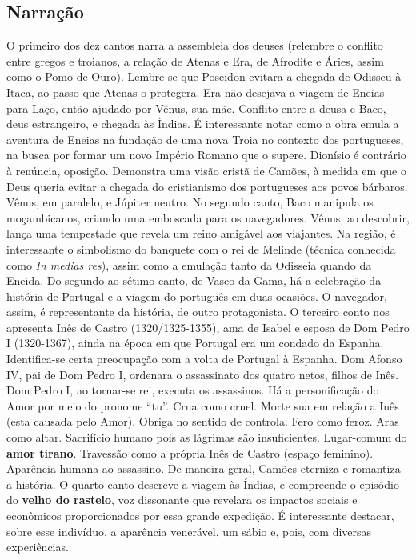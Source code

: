 \documentclass[12pt]{book}
\begin{document}
 				\subsection{Narração}
				\par O primeiro dos dez cantos narra a assembleia dos deuses (relembre o conflito entre gregos e troianos, a relação de Atenas e Era, de Afrodite e Áries, assim como o Pomo de Ouro). Lembre-se que Poseidon evitara a chegada de Odisseu à Itaca, ao passo que Atenas o protegera. Era não desejava a viagem de Eneias para Laço, então ajudado por Vênus, sua mãe. Conflito entre a deusa e Baco, deus estrangeiro, e chegada às Índias. É interessante notar como a obra emula a aventura de Eneias na fundação de uma nova Troia no contexto dos portugueses, na busca por formar um novo Império Romano que o supere. Dionísio é contrário à renúncia, oposição. Demonstra uma visão cristã de Camões, à medida em que o Deus queria evitar a chegada do cristianismo dos portugueses aos povos bárbaros. Vênus, em paralelo, e Júpiter neutro. No segundo canto, Baco manipula os moçambicanos, criando uma emboscada para os navegadores. Vênus, ao descobrir, lança uma tempestade que revela um reino amigável aos viajantes. Na região, é interessante o simbolismo do banquete com o rei de Melinde (técnica conhecida como \textit{In medias res}), assim como a emulação tanto da Odisseia quando da Eneida. Do segundo ao sétimo canto, de Vasco da Gama, há a celebração da história de Portugal e a viagem do português em duas ocasiões. O navegador, assim, é representante da história, de outro protagonista. O terceiro conto nos apresenta Inês de Castro (1320/1325-1355), ama de Isabel e esposa de Dom Pedro I (1320-1367), ainda na época em que Portugal era um condado da Espanha. Identifica-se certa preocupação com a volta de Portugal à Espanha. Dom Afonso IV, pai de Dom Pedro I, ordenara o assassinato dos quatro netos, filhos de Inês. Dom Pedro I, ao tornar-se rei, executa os assassinos. Há a personificação do Amor por meio do pronome ``tu''. Crua como cruel. Morte sua em relação a Inês (esta causada pelo Amor). Obriga no sentido de controla. Fero como feroz. Aras como altar. Sacrifício humano pois as lágrimas são insuficientes. Lugar-comum do \textbf{amor tirano}. Travessão como a própria Inês de Castro (espaço feminino). Aparência humana ao assassino. De maneira geral, Camões eterniza e romantiza a história. O quarto canto descreve a viagem às Índias, e compreende o episódio do \textbf{velho do rastelo}, voz dissonante que revelara os impactos sociais e econômicos proporcionados por essa grande expedição. É interessante destacar, sobre esse indivíduo, a aparência venerável, um sábio e, pois, com diversas experiências.
\end{document}

